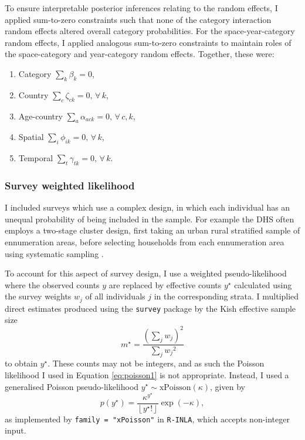 \documentclass[a4paper, nobind]{templates/ociamthesis}
\providecommand{\tightlist}{%
  \setlength{\itemsep}{0pt}\setlength{\parskip}{0pt}}
\begin{document}
To ensure interpretable posterior inferences relating to the random effects, I applied sum-to-zero constraints such that none of the category interaction random effects altered overall category probabilities.
For the space-year-category random effects, I applied analogous sum-to-zero constraints to maintain roles of the space-category and year-category random effects.
Together, these were:

\begin{enumerate}
\def\labelenumi{\arabic{enumi}.}
\tightlist
\item
  Category \(\sum_k \beta_k = 0\),
\item
  Country \(\sum_c \zeta_{ck} = 0, \, \forall \, k\),
\item
  Age-country \(\sum_a \alpha_{ack} = 0, \, \forall \, c, k\),
\item
  Spatial \(\sum_i \phi_{ik} = 0, \, \forall \, k\),
\item
  Temporal \(\sum_t \gamma_{tk} = 0, \, \forall \, k\).
\end{enumerate}

\hypertarget{survey-weighted-likelihood}{%
\subsubsection{Survey weighted likelihood}\label{survey-weighted-likelihood}}

I included surveys which use a complex design, in which each individual has an unequal probability of being included in the sample.
For example the DHS often employs a two-stage cluster design, first taking an urban rural stratified sample of ennumeration areas, before selecting households from each ennumeration area using systematic sampling \autocite{measure2012sampling}.

To account for this aspect of survey design, I use a weighted pseudo-likelihood where the observed counts \(y\) are replaced by effective counts \(y^\star\) calculated using the survey weights \(w_j\) of all individuals \(j\) in the corresponding strata.
I multiplied direct estimates produced using the \texttt{survey} package \autocite{JSSv009i08} by the Kish effective sample size \autocite{kish1965survey}
\begin{equation}
    m^\star = \frac{\left(\sum_j w_j \right)^2}{\sum_j {w_j}^2}
\end{equation}
to obtain \(y^\star\).
These counts may not be integers, and as such the Poisson likelihood I used in Equation \eqref{eq:poisson1} is not appropriate.
Instead, I used a generalised Poisson pseudo-likelihood \(y^\star \sim \text{xPoisson}(\kappa)\), given by
\begin{equation}
    p(y^\star) = \frac{\kappa^{y^\star}}{\left \lfloor{y^\star!}\right \rfloor } \exp \left(- \kappa \right),
\end{equation}
as implemented by \texttt{family\ =\ "xPoisson"} in \texttt{R-INLA}, which accepts non-integer input.
\end{document}
